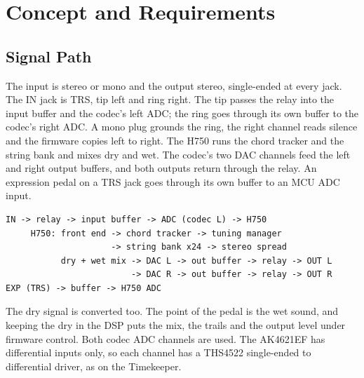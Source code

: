 \chapter{Concept and Requirements}\label{ch:concept}

\section{Signal Path}
The input is stereo or mono and the output stereo, single-ended at every jack. The IN jack is TRS, tip left and ring right. The tip passes the relay into the input buffer and the codec's left ADC; the ring goes through its own buffer to the codec's right ADC. A mono plug grounds the ring, the right channel reads silence and the firmware copies left to right. The H750 runs the chord tracker and the string bank and mixes dry and wet. The codec's two DAC channels feed the left and right output buffers, and both outputs return through the relay. An expression pedal on a TRS jack goes through its own buffer to an MCU ADC input.

{\small
\begin{verbatim}
IN -> relay -> input buffer -> ADC (codec L) -> H750
     H750: front end -> chord tracker -> tuning manager
                     -> string bank x24 -> stereo spread
           dry + wet mix -> DAC L -> out buffer -> relay -> OUT L
                         -> DAC R -> out buffer -> relay -> OUT R
EXP (TRS) -> buffer -> H750 ADC
\end{verbatim}
}

The dry signal is converted too. The point of the pedal is the wet sound, and keeping the dry in the DSP puts the mix, the trails and the output level under firmware control. Both codec ADC channels are used. The AK4621EF has differential inputs only, so each channel has a THS4522 single-ended to differential driver, as on the Timekeeper.


